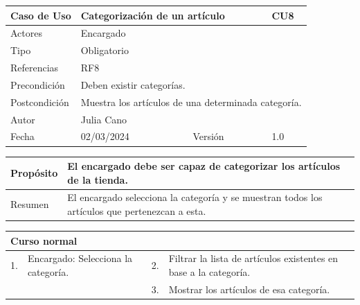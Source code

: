 \begin{table}[H]
	\centering
	\begin{tabular}{| m{} | m{} | m{} | m{}|}
		\hline
		\rowcolor{grayshade} Caso de Uso & \multicolumn{2}{|m{0.43\textwidth}|}{Categorización de un artículo} &  CU8\\ 
		\hline
		Actores & \multicolumn{3}{l|}{Encargado} \\ 
		\hline
		Tipo & \multicolumn{3}{l|}{Obligatorio} \\ 
		\hline
		Referencias & \multicolumn{3}{l|}{RF8} \\ 
		\hline
		Precondición & \multicolumn{3}{m{0.67\textwidth}|}{Deben existir categorías.} \\ 
		\hline
		Postcondición & \multicolumn{3}{m{0.67\textwidth}|}{Muestra los artículos de una determinada categoría.} \\ 
		\hline
		Autor & \multicolumn{3}{l|}{Julia Cano} \\ 
		\hline
		Fecha & 02/03/2024 & Versión & 1.0 \\
		\hline
	\end{tabular}
\end{table}

\begin{table}[H]
	\centering
	\begin{tabular}{| m{} | m{} | m{} | m{} |}
		\hline
		Propósito & \multicolumn{3}{m{0.67\textwidth}|}{El encargado debe ser capaz de categorizar los artículos de la tienda.}  \\ 
		\hline
		Resumen & \multicolumn{3}{m{0.67\textwidth}|}{El encargado selecciona la categoría y se muestran todos los artículos que pertenezcan a esta.} \\ 
		\hline
	\end{tabular}
\end{table}


\begin{table}[H]
	\centering
	\begin{tabular}{| m{} | m{} | m{} | m{} |}
		\hline
		\multicolumn{4}{|m{0.9\textwidth}|}{Curso normal}     \\ 
		\hline
		1. & Encargado: Selecciona la categoría. & 2. &  Filtrar la lista de artículos existentes en base a la categoría.  \\ 
		\hline
		&  & 3. & Mostrar los artículos de esa categoría.  \\ 
		\hline
	\end{tabular}
\end{table}

